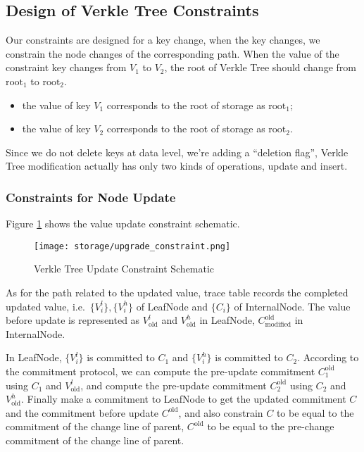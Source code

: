 \subsection{Design of Verkle Tree Constraints}

Our constraints are designed for a key change, when the key changes, we constrain the node changes of the corresponding path. When the value of the constraint key changes from $V_1$ to $V_2$, the root of Verkle Tree should change from $\text{root}_1$ to $\text{root}_2$.
\begin{itemize}
    \item the value of key $V_1$ corresponds to the root of storage as $\text{root}_1$;
    \item the value of key $V_2$ corresponds to the root of storage as $\text{root}_2$.
\end{itemize}

Since we do not delete keys at data level, we're adding a ``deletion flag'', Verkle Tree modification actually has only two kinds of operations, update and insert.

\subsubsection{Constraints for Node Update}

Figure \ref{fig:upgrade-constraint} shows the value update constraint schematic.
\begin{figure}[!ht]
    \centering
    \texttt{[image: storage/upgrade\_constraint.png]}
    \caption{Verkle Tree Update Constraint Schematic}
    \label{fig:upgrade-constraint}
\end{figure}

As for the path related to the updated value, trace table records the completed updated value, i.e.\ $\{V^l_i\}, \{V^h_i\}$ of LeafNode and $\{C_i\}$ of InternalNode. The value before update is represented as $V^l_\text{old}$ and $V^h_\text{old}$ in LeafNode, $C^\text{old}_\text{modified}$ in InternalNode.

In LeafNode, $\{V^l_i\}$ is committed to $C_1$ and $\{V^h_i\}$ is committed to $C_2$. According to the commitment protocol, we can compute the pre-update commitment $C^\text{old}_1$ using $C_1$ and $V^l_\text{old}$, and compute the pre-update commitment $C^\text{old}_2$ using $C_2$ and $V^h_\text{old}$. Finally make a commitment to LeafNode to get the updated commitment $C$ and the commitment before update $C^\text{old}$, and also constrain $C$ to be equal to the commitment of the change line of parent, $C^\text{old}$ to be equal to the pre-change commitment of the change line of parent.

